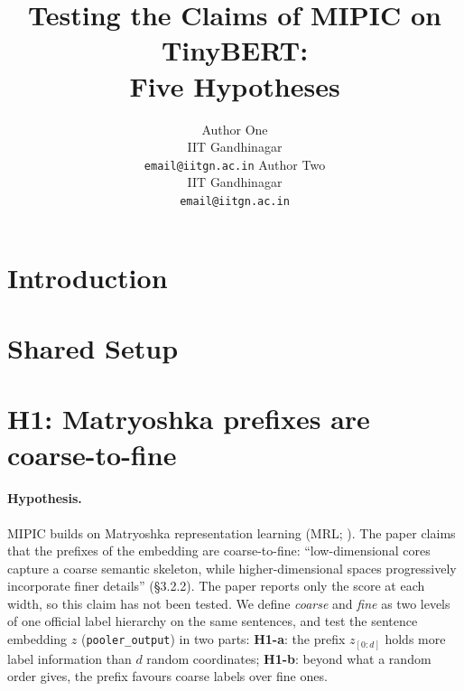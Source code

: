\documentclass[11pt]{article}
\title{Testing the Claims of MIPIC on TinyBERT: \\ Five Hypotheses}
\author{
  Author One \\ IIT Gandhinagar \\ \texttt{email@iitgn.ac.in} \And
  Author Two \\ IIT Gandhinagar \\ \texttt{email@iitgn.ac.in}
}
\begin{document}
\maketitle

\begin{abstract}
\end{abstract}

\section{Introduction}
\label{sec:intro}

\section{Shared Setup}
\label{sec:setup}

\section{H1: Matryoshka prefixes are coarse-to-fine}
\label{sec:h1}

\paragraph{Hypothesis.}
MIPIC \citep{mipic2026} builds on Matryoshka representation learning (MRL; \citealp{kusupati2022mrl}).
The paper claims that the prefixes of the embedding are coarse-to-fine:
``low-dimensional cores capture a coarse semantic skeleton, while higher-dimensional spaces progressively incorporate finer details'' (\S3.2.2).
The paper reports only the score at each width, so this claim has not been tested.
We define \emph{coarse} and \emph{fine} as two levels of one official label hierarchy on the same sentences, and test the sentence embedding $z$ (\texttt{pooler\_output}) in two parts:
\textbf{H1-a}: the prefix $z_{[0:d]}$ holds more label information than $d$ random coordinates;
\textbf{H1-b}: beyond what a random order gives, the prefix favours coarse labels over fine ones.
\end{document}
